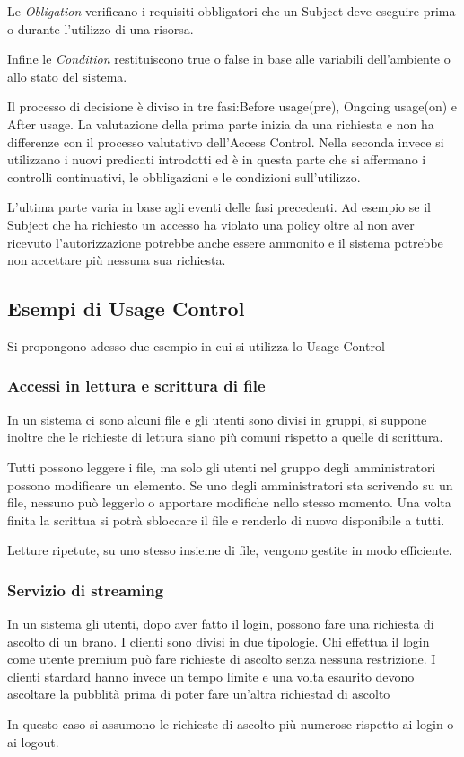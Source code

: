 Le \emph{Obligation} verificano i requisiti obbligatori che un Subject deve eseguire prima o durante l'utilizzo di una risorsa.\par
Infine le \emph{Condition} restituiscono true o false in base alle variabili dell'ambiente o allo stato del sistema.\par
Il processo di decisione è diviso in tre fasi\cite{SurveyUsageControl}:Before usage(pre), Ongoing usage(on) e After usage.
La valutazione della prima parte inizia da una richiesta e non ha differenze con il processo valutativo dell'Access Control.
Nella seconda invece si utilizzano i nuovi predicati introdotti ed è in questa parte che si affermano i controlli continuativi,
le obbligazioni e le condizioni sull'utilizzo.\par
L'ultima parte varia in base agli eventi delle fasi precedenti. Ad esempio se il Subject che ha richiesto un accesso ha violato
una policy oltre al non aver ricevuto l'autorizzazione potrebbe anche essere ammonito e il sistema potrebbe non accettare più
nessuna sua richiesta.

\subsection{Esempi di Usage Control}
\label{subs:es_UC}
Si propongono adesso due esempio in cui si utilizza lo Usage Control
\subsubsection*{Accessi in lettura e scrittura di file}
\label{subs:Accessi in lettura e scrittura di file}
In un sistema ci sono alcuni file e gli utenti sono divisi in gruppi, si suppone inoltre che le richieste di lettura
siano più comuni rispetto a quelle di scrittura.\par Tutti possono leggere i file, ma solo
gli utenti nel gruppo degli amministratori possono modificare un elemento. Se uno degli amministratori sta scrivendo
su un file, nessuno può leggerlo o apportare modifiche nello stesso momento. Una volta finita la scrittua si potrà sbloccare
il file e renderlo di nuovo disponibile a tutti.\par
Letture ripetute, su uno stesso insieme di file, vengono gestite in modo efficiente.
\subsubsection{Servizio di streaming}
\label{subs:Servizio di streaming}
In un sistema gli utenti, dopo aver fatto il login, possono fare una richiesta di ascolto di un brano. I clienti
sono divisi in due tipologie. Chi effettua il login come utente premium può fare richieste di ascolto senza nessuna restrizione.
I clienti stardard hanno invece un tempo limite e una volta esaurito devono ascoltare la pubblità prima di poter fare
un'altra richiestad di ascolto\par
In questo caso si assumono le richieste di ascolto più numerose rispetto ai login o ai logout.
